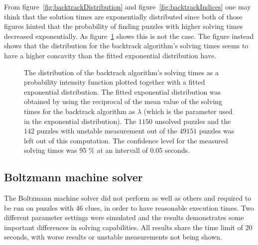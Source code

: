 \documentclass[a4paper,11pt]{kth-mag}
\begin{document}
\FloatBarrier
From figure~\ref{fig:backtrackDistribution} and figure~\ref{fig:backtrackIndices} one may think that the solution times are exponentially distributed since both of those figures hinted that the probability of finding puzzles with higher solving times decreased exponentially.
As figure~\ref{fig:backtrackExponential} shows this is not the case.
The figure instead shows that the distribution for the backtrack algorithm's solving times seems to have a higher concavity than the fitted exponential distribution have.

\begin{figure}[here] 
\noindent{}
\vspace{-15pt}
\caption{The distribution of the backtrack algorithm's solving times as a probability intensity function plotted together with a fitted exponential distribution. 
The fitted exponential distribution was obtained by using the reciprocal of the mean value of the solving times for the backtrack algorithm as $\lambda$ (which is the parameter used in the exponential distribution). 
The $1150$ unsolved puzzles and the $142$ puzzles with unstable measurement out of the $49151$ puzzles was left out of this computation. 
The confidence level for the measured solving times was 95 \% at an intervall of 0.05 seconds.}
\label{fig:backtrackExponential}
\end{figure}

\FloatBarrier
\subsection{Boltzmann machine solver}
The Boltzmann machine solver did not perform as well as others and required to be run on puzzles with 46 clues, in order to have reasonable execution times.
Two different parameter settings were simulated and the results demonstrates some important differences in solving capabilities.
All results share the time limit of 20 seconds, with worse results or unstable measurements not being shown.
\end{document}
